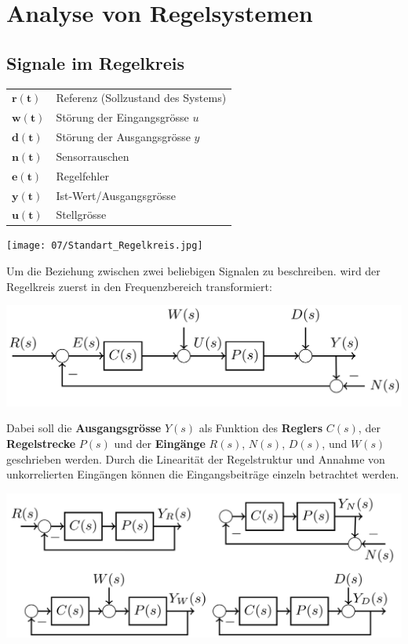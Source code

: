 \section{Analyse von Regelsystemen}
    \subsection{Signale im Regelkreis}
    \begin{tabular}{l|l}
    $\mathbf{r(t)}$& Referenz (Sollzustand des Systems)\\
    $\mathbf{w(t)}$& Störung der Eingangsgrösse $u$\\
    $\mathbf{d(t)}$& Störung der Ausgangsgrösse $y$\\
    $\mathbf{n(t)}$& Sensorrauschen\\
    $\mathbf{e(t)}$& Regelfehler\\
    $\mathbf{y(t)}$& Ist-Wert/Ausgangsgrösse\\
    $\mathbf{u(t)}$& Stellgrösse\\
    \end{tabular}
    
    \begin{center}
        \texttt{[image: 07/Standart\_Regelkreis.jpg]}
    \end{center}
    
    Um die Beziehung zwischen zwei beliebigen Signalen zu beschreiben. wird der Regelkreis zuerst in den Frequenzbereich transformiert:

    \begin{center}
        \includegraphics[width = 0.8\linewidth]{images/07/Standart_Regelkreis_FB.jpg}
    \end{center}
    
    Dabei soll die \textbf{Ausgangsgrösse} $Y(s)$ als Funktion des \textbf{Reglers} $C(s)$, der \textbf{Regelstrecke} $P(s)$ und der \textbf{Eingänge} $R(s)$, $N(s)$, $D(s)$, und $W(s)$ geschrieben werden.
    Durch die Linearität der Regelstruktur und Annahme von unkorrelierten Eingängen können die Eingangsbeiträge einzeln betrachtet werden.
    
    \includegraphics[width = \linewidth]{images/07/Eingangsbeitraege.jpg}
    
